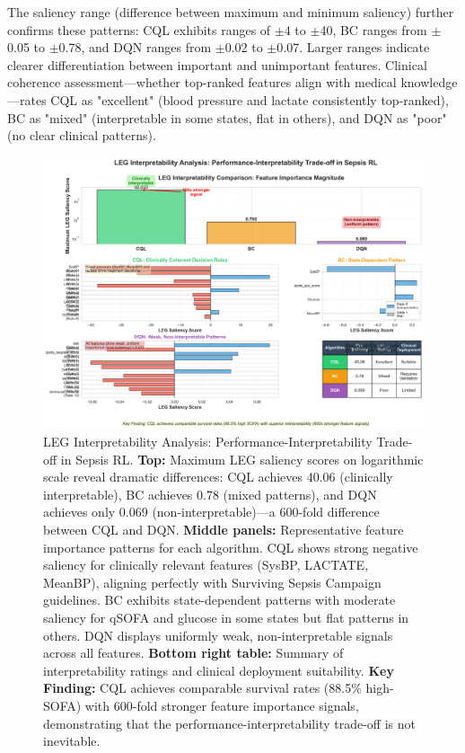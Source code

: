 The saliency range (difference between maximum and minimum saliency) further confirms these patterns: CQL exhibits ranges of $\pm$4 to $\pm$40, BC ranges from $\pm$0.05 to $\pm$0.78, and DQN ranges from $\pm$0.02 to $\pm$0.07. Larger ranges indicate clearer differentiation between important and unimportant features. Clinical coherence assessment—whether top-ranked features align with medical knowledge—rates CQL as "excellent" (blood pressure and lactate consistently top-ranked), BC as "mixed" (interpretable in some states, flat in others), and DQN as "poor" (no clear clinical patterns).

\begin{figure}[htbp]
\centering
\includegraphics[width=\textwidth]{../results/figures/leg_interpretability_comparison.png}
\caption{LEG Interpretability Analysis: Performance-Interpretability Trade-off in Sepsis RL. \textbf{Top:} Maximum LEG saliency scores on logarithmic scale reveal dramatic differences: CQL achieves 40.06 (clinically interpretable), BC achieves 0.78 (mixed patterns), and DQN achieves only 0.069 (non-interpretable)—a 600-fold difference between CQL and DQN. \textbf{Middle panels:} Representative feature importance patterns for each algorithm. CQL shows strong negative saliency for clinically relevant features (SysBP, LACTATE, MeanBP), aligning perfectly with Surviving Sepsis Campaign guidelines. BC exhibits state-dependent patterns with moderate saliency for qSOFA and glucose in some states but flat patterns in others. DQN displays uniformly weak, non-interpretable signals across all features. \textbf{Bottom right table:} Summary of interpretability ratings and clinical deployment suitability. \textbf{Key Finding:} CQL achieves comparable survival rates (88.5\% high-SOFA) with 600-fold stronger feature importance signals, demonstrating that the performance-interpretability trade-off is not inevitable.}
\label{fig:leg-comparison}
\end{figure}

